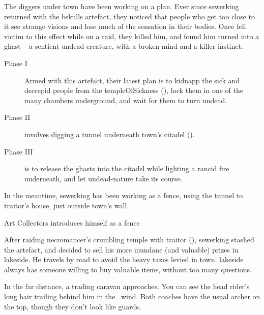 \label{sewerking}

\begin{exampletext}
  \noindent
  The \glspl{digger} under \gls{town} have been working on a plan.
  Ever since \gls{sewerking} returned with the \gls{bskulls} \gls{artefact}, they noticed that people who get too close to it see strange visions and lose much of the sensation in their bodies.
  Once  fell victim to this effect while on a raid, they killed him, and found him turned into a ghast -- a sentient undead creature, with a broken mind and a killer instinct.%

  \label{ghastPlan}
  \begin{description}
    \item[Phase I]
    Armed with this \gls{artefact}, their latest plan is to kidnapp the sick and decrepid people from the \gls{templeOfSickness} (), lock them in one of the many chambers underground, and wait for them to turn undead.
    \item[Phase II]
    involves digging a tunnel underneath \gls{town}'s citadel ().
    \item[Phase III]
    is to release the ghasts into the citadel while lighting a rancid fire underneath, and let undead-nature take its course.
  \end{description}

  In the meantime, \gls{sewerking} has been working as a fence, using the tunnel to \gls{traitor}'s house, just outside \gls{town}'s wall.

\end{exampletext}

{Art Collectors}%
{ introduces himself as a fence}%

\begin{exampletext}
  After raiding \gls{necromancer}'s crumbling temple with \gls{traitor} (), \gls{sewerking} stashed the \gls{artefact}, and decided to sell his more mundane (and valuable) prizes in \gls{lakeside}.
  He travels by road to avoid the heavy taxes levied in \gls{town}.%
  \Gls{lakeside} always has someone willing to buy valuable items, without too many questions.
\end{exampletext}

\begin{boxtext}
  In the far distance, a trading caravan approaches.
  You can see the head rider's long hair trailing behind him in the \showTemperature\ wind.
  Both coaches have the usual archer on the top, though they don't look like \glspl{guard}.
\end{boxtext}

